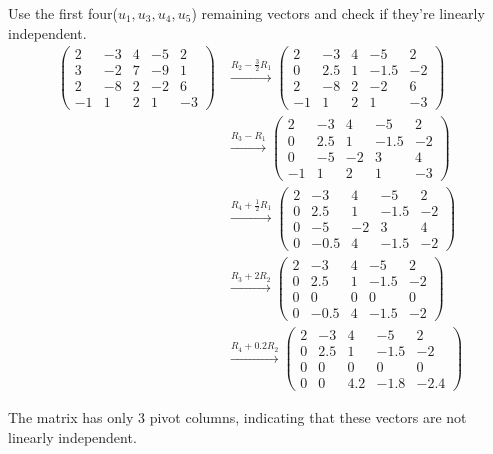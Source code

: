 \documentclass{article}
\begin{document}
Use the first four($u_1, u_3, u_4, u_5$) remaining vectors and check if they're linearly independent.
\begin{align*}
\begin{pmatrix}
2 & -3 & 4 & -5 & 2 \\
3 & -2 & 7 & -9 & 1 \\
2 & -8 & 2 & -2 & 6 \\
-1 & 1 & 2 & 1 & -3
\end{pmatrix}
&\xrightarrow{R_2 - \frac{3}{2}R_1}
\begin{pmatrix}
2 & -3 & 4 & -5 & 2 \\
0 & 2.5 & 1 & -1.5 & -2 \\
2 & -8 & 2 & -2 & 6 \\
-1 & 1 & 2 & 1 & -3
\end{pmatrix} \\
&\xrightarrow{R_3 - R_1}
\begin{pmatrix}
2 & -3 & 4 & -5 & 2 \\
0 & 2.5 & 1 & -1.5 & -2 \\
0 & -5 & -2 & 3 & 4 \\
-1 & 1 & 2 & 1 & -3
\end{pmatrix} \\
&\xrightarrow{R_4 + \frac{1}{2}R_1}
\begin{pmatrix}
2 & -3 & 4 & -5 & 2 \\
0 & 2.5 & 1 & -1.5 & -2 \\
0 & -5 & -2 & 3 & 4 \\
0 & -0.5 & 4 & -1.5 & -2
\end{pmatrix} \\
&\xrightarrow{R_3 + 2R_2}
\begin{pmatrix}
2 & -3 & 4 & -5 & 2 \\
0 & 2.5 & 1 & -1.5 & -2 \\
0 & 0 & 0 & 0 & 0 \\
0 & -0.5 & 4 & -1.5 & -2
\end{pmatrix} \\
&\xrightarrow{R_4 + 0.2R_2}
\begin{pmatrix}
2 & -3 & 4 & -5 & 2 \\
0 & 2.5 & 1 & -1.5 & -2 \\
0 & 0 & 0 & 0 & 0 \\
0 & 0 & 4.2 & -1.8 & -2.4
\end{pmatrix}
\end{align*}

The matrix has only 3 pivot columns, indicating that these vectors are not linearly independent. \\
\end{document}
